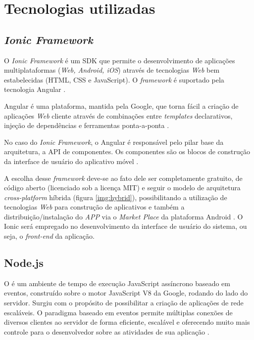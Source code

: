 \section{Tecnologias  utilizadas}

\subsection{\textit{Ionic Framework}} \label{subsec:Ionic}

O \textit{Ionic Framework} é um SDK que permite o desenvolvimento de aplicações multiplataformas (\textit{Web, Android, iOS}) através de tecnologias \textit{Web} bem estabelecidas (HTML, CSS e JavaScript). O \textit{framework} é suportado pela tecnologia Angular \cite{SITEIONIC}.

Angular é uma plataforma, mantida pela Google, que torna fácil a criação de aplicações \textit{Web} cliente através de combinações entre \textit{templates} declarativos, injeção de dependências e ferramentas ponta-a-ponta \cite{SITEANGULAR}.

No caso do \textit{Ionic Framework}, o Angular é responsável pelo pilar base da arquitetura, a API de componentes. Os componentes são os blocos de construção da interface de usuário do aplicativo móvel \cite{SITEIONIC}.

A escolha desse \textit{framework} deve-se ao fato dele ser completamente gratuito, de código aberto (licenciado sob a licença MIT) e seguir o modelo de arquitetura \textit{cross-platform} híbrida (figura \ref{img:hybrid}), possibilitando a utilização de tecnologias \textit{Web} para construção de aplicativos e também a distribuição/instalação do \textit{APP} via o \textit{Market Place} da plataforma Android \cite{SITEIONIC}. O Ionic será empregado no desenvolvimento da interface de usuário do sistema, ou seja, o \textit{front-end} da aplicação.


\newpage

\subsection{Node.js} \label{subsec:NodeJs}

O  é um ambiente de tempo de execução JavaScript assíncrono baseado em eventos, construído sobre o motor JavaScript V8 da Google, rodando do lado do servidor. Surgiu com o propósito de possibilitar a criação de aplicações de rede escaláveis. O paradigma baseado em eventos permite múltiplas conexões de diversos clientes ao servidor de forma eficiente, escalável e oferecendo muito mais controle para o desenvolvedor sobre as atividades de sua aplicação \cite{tilkov2010node}.
    
